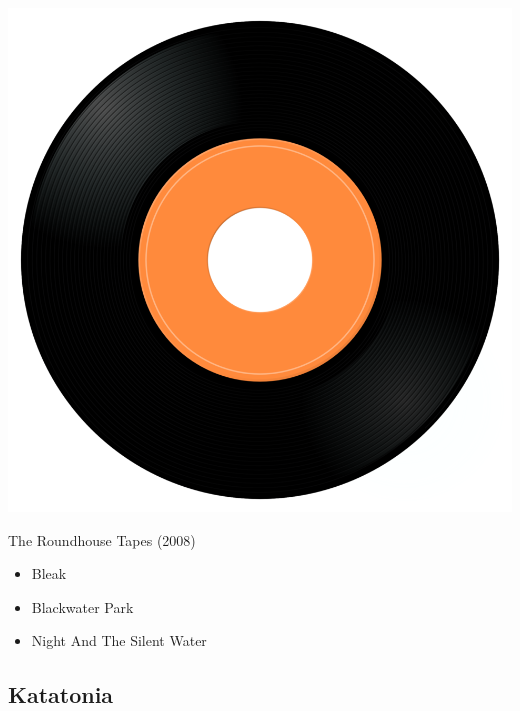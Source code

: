\begin{minipage}[t]{0.25\textwidth}
\captionsetup{type=figure}
\includegraphics[width=\textwidth]{Images/cover.png}
\caption*{The Roundhouse Tapes (2008)}
\end{minipage}
\begin{minipage}[t]{0.25\textwidth}\vspace{0pt}
\begin{itemize}[nosep,leftmargin=1em,labelwidth=*,align=left]
	\setlength{\itemsep}{0pt}
	\item Bleak
	\item Blackwater Park
	\item Night And The Silent Water
\end{itemize}
\end{minipage}

\subsection{Katatonia}

